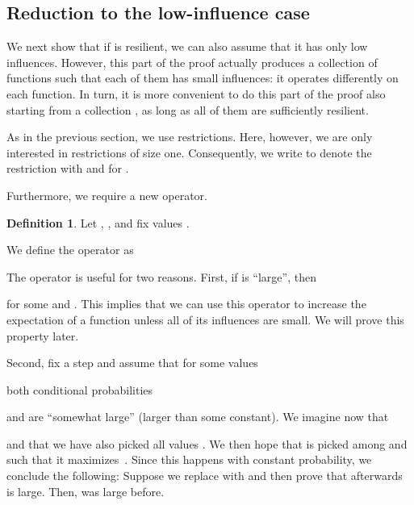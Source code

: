 \documentclass{daj}
\newcommand{\1}{\mathbbm{1}}
\theoremstyle{plain}
\theoremstyle{definition}
\newtheorem{definition}[theorem]{Definition}
\begin{document}
\subsection{Reduction to the low-influence case}
We next show that if  is resilient, we can also assume that it has
only low influences.
However, this part of the proof actually produces a collection of functions 
 such that each of them
has small influences: it operates differently on each function.
In turn, it is more convenient to do this part of the proof also starting 
from a collection , as long as all of
them are sufficiently resilient.

\medskip

As in the previous section, we use restrictions.
Here, however, we are only interested in restrictions of size one.
Consequently, we write  to denote 
the restriction 
with  and  for .

Furthermore, we require a new operator.
\begin{definition}
Let , ,
and fix values .

We define the operator  as

\end{definition}

The operator  is useful for two reasons.
First, if  is ``large'', then

for some  and .  This implies that we can use this
operator to increase the expectation of a function unless all of its
influences are small. We will prove this property later.

Second, fix a step  and assume that for some values

both conditional probabilities

and
 are ``somewhat large'' (larger than some constant).
We imagine now that 

and that we have also picked all values
.
We then hope that  is picked among  and  such that it
maximizes~.  Since this happens with constant probability, we
conclude the following: Suppose we replace  with
 and then prove that afterwards
 is large.  Then,
 was large before.
\end{document}
